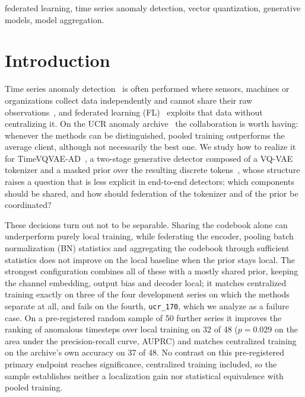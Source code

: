 \documentclass[conference]{IEEEtran}
\begin{document}
\begin{IEEEkeywords}
federated learning, time series anomaly detection, vector quantization, generative models, model aggregation.
\end{IEEEkeywords}

\section{Introduction}

Time series anomaly detection~\cite{blazquezgarcia2022review,schmidl2022anomaly} is often performed
where sensors, machines or organizations collect data independently and cannot share their raw
observations~\cite{zhu2022fedexdnn,xu2024pefad}, and federated learning
(FL)~\cite{mcmahan2017federated} exploits that data without centralizing it. On the UCR anomaly
archive~\cite{wu2023ucr} the collaboration is worth having: whenever the methods can be
distinguished, pooled training outperforms the average client, although not necessarily the best
one. We study how to realize it for TimeVQVAE-AD~\cite{lee2024timevqvaead}, a two-stage generative
detector composed of a VQ-VAE~\cite{van2017neural} tokenizer and a masked prior over the resulting
discrete tokens~\cite{lee2023timevqvae}, whose structure raises a question that is less explicit in
end-to-end detectors: which components should be shared, and how should federation of the tokenizer
and of the prior be coordinated?

These decisions turn out not to be separable. Sharing the codebook alone can underperform purely
local training, while federating the encoder, pooling batch normalization (BN) statistics and
aggregating the codebook through sufficient statistics does not improve on the local baseline when
the prior stays local. The strongest configuration combines all of these with a mostly shared prior,
keeping the channel embedding, output bias and decoder local; it matches centralized training
exactly on three of the four development series on which the methods separate at all, and fails on
the fourth, \texttt{ucr\_170}, which we analyze as a failure case. On a pre-registered random sample of
50 further series it improves the ranking of anomalous timesteps over local training on 32 of 48
($p=0.029$ on the area under the precision-recall curve, AUPRC) and matches centralized training
on the archive's own accuracy on 37 of 48. No contrast on this pre-registered primary endpoint
reaches significance, centralized training included, so the sample establishes neither a
localization gain nor statistical equivalence with pooled training.
\end{document}
